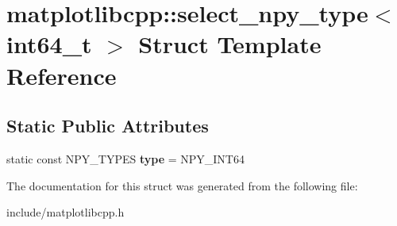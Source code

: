 \hypertarget{structmatplotlibcpp_1_1select__npy__type_3_01int64__t_01_4}{}\section{matplotlibcpp\+:\+:select\+\_\+npy\+\_\+type$<$ int64\+\_\+t $>$ Struct Template Reference}
\label{structmatplotlibcpp_1_1select__npy__type_3_01int64__t_01_4}
\subsection*{Static Public Attributes}
\begin{DoxyCompactItemize}
\item 
static const N\+P\+Y\+\_\+\+T\+Y\+P\+ES {\bfseries type} = N\+P\+Y\+\_\+\+I\+N\+T64\hypertarget{structmatplotlibcpp_1_1select__npy__type_3_01int64__t_01_4_a0d20ea35e520ad9381aca3c173f3f02d}{}\label{structmatplotlibcpp_1_1select__npy__type_3_01int64__t_01_4_a0d20ea35e520ad9381aca3c173f3f02d}

\end{DoxyCompactItemize}


The documentation for this struct was generated from the following file\+:\begin{DoxyCompactItemize}
\item 
include/matplotlibcpp.\+h\end{DoxyCompactItemize}

